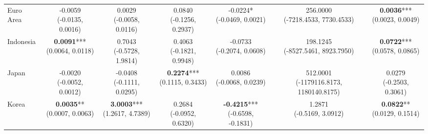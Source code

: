 \documentclass[a4paper,10pt,final]{article}    %
\begin{document}
\begin{table}[htbp]
{\begin{tabular}{l|cccccc}
            Euro Area      & \makecell{-0.0059                                                                   \\ \scriptsize{(-0.0135, 0.0016)}} & \makecell{0.0029 \\ \scriptsize{(-0.0058, 0.0116)}} & \makecell{0.0840 \\ \scriptsize{(-0.1256, 0.2937)}} & \makecell{-0.0224* \\ \scriptsize{(-0.0469, 0.0021)}} & \makecell{256.0000 \\ \scriptsize{(-7218.4533, 7730.4533)}} & \makecell{\textbf{0.0036}*** \\ \scriptsize{(0.0023, 0.0049)}} \\
            Indonesia      & \makecell{\textbf{0.0091}***                                                        \\ \scriptsize{(0.0064, 0.0118)}} & \makecell{0.7043 \\ \scriptsize{(-0.5728, 1.9814)}} & \makecell{0.4063 \\ \scriptsize{(-0.1821, 0.9948)}} & \makecell{-0.0733 \\ \scriptsize{(-0.2074, 0.0608)}} & \makecell{198.1245 \\ \scriptsize{(-8527.5461, 8923.7950)}} & \makecell{\textbf{0.0722}*** \\ \scriptsize{(0.0578, 0.0865)}} \\
            Japan          & \makecell{-0.0020                                                                   \\ \scriptsize{(-0.0052, 0.0012)}} & \makecell{-0.0408 \\ \scriptsize{(-0.1111, 0.0295)}} & \makecell{\textbf{0.2274}*** \\ \scriptsize{(0.1115, 0.3433)}} & \makecell{0.0086 \\ \scriptsize{(-0.0068, 0.0239)}} & \makecell{512.0001 \\ \scriptsize{(-1179116.8173, 1180140.8175)}} & \makecell{0.0279 \\ \scriptsize{(-0.2503, 0.3061)}} \\
            Korea          & \makecell{\textbf{0.0035}**                                                         \\ \scriptsize{(0.0007, 0.0063)}} & \makecell{\textbf{3.0003}*** \\ \scriptsize{(1.2617, 4.7389)}} & \makecell{0.2684 \\ \scriptsize{(-0.0952, 0.6320)}} & \makecell{\textbf{-0.4215}*** \\ \scriptsize{(-0.6598, -0.1831)}} & \makecell{1.2871 \\ \scriptsize{(-0.5169, 3.0912)}} & \makecell{\textbf{0.0822}** \\ \scriptsize{(0.0129, 0.1514)}} \\

\end{tabular}}
\end{table}
\end{document}
